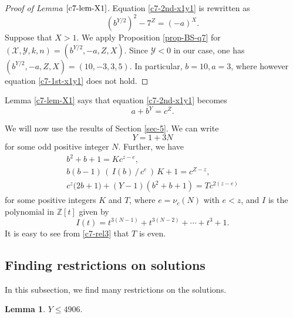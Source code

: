 \documentclass[11pt]{amsart}
\newtheorem{lem}{Lemma}[section]
\numberwithin{equation}{section}
\begin{document}
\begin{proof}[Proof of Lemma $\ref{c7-lem-X1}$]
Equation \eqref{c7-2nd-x1y1} is rewritten as
\[
(b^{Y/2})^2-7^Z=(-a)^X.
\]
Suppose that $X>1$.
We apply Proposition \ref{prop-BS-q7} for $(\mathcal X,\mathcal Y,k,n)=(b^{Y/2},-a,Z,X)$.
Since $\mathcal Y<0$ in our case, one has $(b^{Y/2},-a,Z,X)=(10,-3,3,5)$.
In particular, $b=10,a=3$, where however equation \eqref{c7-1st-x1y1} does not hold.
\end{proof}

Lemma \ref{c7-lem-X1} says that equation \eqref{c7-2nd-x1y1} becomes
\begin{equation}\label{c7-2nd-x1y1X1}
a+b^Y=c^Z.
\end{equation}

We will now use the results of Section \ref{sec-5}.
We can write
\begin{equation} \label{c7-Y-cong}
Y =1+3N
\end{equation}
for some odd positive integer $N$.
Further, we have
\begin{gather}
b^2+b+1=K c^{z-e}, \label{c7-rel1}\\
b(b-1)\,(\,I(b)\,/\,c^e\,)\,K+1=c^{Z-z}, \label{c7-rel2}\\
c^{z} \mathcal (2b+1)+(Y-1)(b^2+b+1)=T c^{2(z-e)} \label{c7-rel3}
\end{gather}
for some positive integers $K$ and $T$, where $e=\nu_c(N)$ with $e<z$, and $I$ is the polynomial in $\mathbb Z[t]$ given by
\[
I(t)=t^{3(N-1)}+t^{3(N-2)}+ \cdots + t^3 +1.
\]
It is easy to see from \eqref{c7-rel3} that $T$ is even. %

\subsection{Finding restrictions on solutions}
%
In this subsection, we find many restrictions on the solutions.

\begin{lem}\label{lem-c7-Yge4906}
$Y \le 4906.$
\end{lem}
\end{document}

